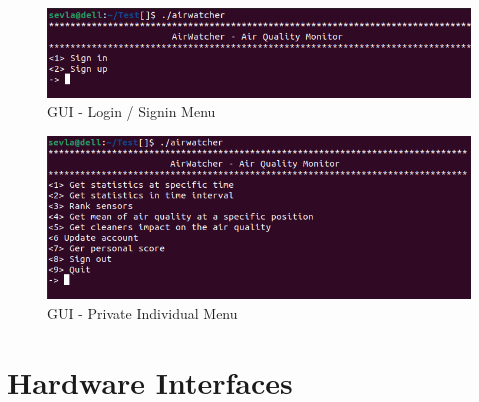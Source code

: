 \documentclass{report}
\begin{document}
\begin{figure}
	\begin{center}
		\includegraphics[scale=.6]{gui-1.png}
	\end{center}
	\caption{GUI - Login / Signin Menu}
	\label{fig:gui_1}
\end{figure}

\begin{figure}
	\begin{center}
		\includegraphics[scale=.6]{gui-2.png}
	\end{center}
	\caption{GUI - Private Individual Menu}
	\label{fig:gui_2}
\end{figure}


\section{Hardware Interfaces} ~~~
\end{document}
